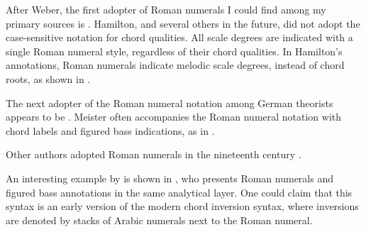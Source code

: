 
After Weber, the first adopter of Roman numerals I could
find among my primary sources is
\textcite{hamilton1840catechism}. Hamilton, and several
others in the future, did not adopt the case-sensitive
notation for chord qualities. All scale degrees are
indicated with a single Roman numeral style, regardless of
their chord qualities. In Hamilton's annotations, Roman
numerals indicate melodic scale degrees, instead of chord
roots, as shown in
.


The next adopter of the Roman numeral notation among German
theorists appears to be \textcite{meister1852vollstandige}.
Meister often accompanies the Roman numeral notation with
chord labels and figured bass indications, as in
.


Other authors adopted Roman numerals in the nineteenth
century \parencite{sechter1853grundsatze,
richter1860lehrbuch, tiersch1874elementarbuch,
tracy1878theory}.

An interesting example by \textcite{bussler1878praktische}
is shown in
, who
presents Roman numerals and figured bass annotations in the
same analytical layer. One could claim that this syntax is
an early version of the modern chord inversion syntax, where
inversions are denoted by stacks of Arabic numerals next to
the Roman numeral.


